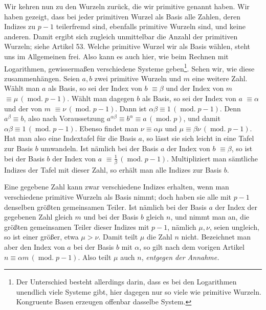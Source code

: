 Wir kehren nun zu den Wurzeln zurück, die wir primitive genannt haben. Wir haben gezeigt, dass bei jeder primitiven Wurzel als Basis alle Zahlen, deren Indizes zu $p-1$ teilerfremd sind, ebenfalls primitive Wurzeln sind, und keine anderen. Damit ergibt sich zugleich unmittelbar die Anzahl der primitiven Wurzeln; siehe Artikel 53. Welche primitive Wurzel wir als Basis wählen, steht uns im Allgemeinen frei. Also kann es auch hier, wie beim Rechnen mit Logarithmen, gewissermaßen verschiedene Systeme geben\begingroup\renewcommand{\thefootnote}{*)}\footnote{Der Unterschied besteht allerdings darin, dass es bei den Logarithmen unendlich viele Systeme gibt, hier dagegen nur so viele wie primitive Wurzeln. Kongruente Basen erzeugen offenbar dasselbe System.}\endgroup.
Sehen wir, wie diese zusammenhängen. Seien $a,b$ zwei primitive Wurzeln und $m$ eine weitere Zahl. Wählt man $a$ als Basis, so sei der Index von $b$ $\equiv\beta$ und der Index von $m$ $\equiv\mu\,(\operatorname{mod.}p-1)$. Wählt man dagegen $b$ als Basis, so sei der Index von $a$ $\equiv\alpha$ und der von $m$ $\equiv\nu\,(\operatorname{mod.}p-1)$. Dann ist $\alpha\beta\equiv1\,(\operatorname{mod.}p-1)$. Denn $a^\beta\equiv b$, also nach Voraussetzung $a^{\alpha\beta}\equiv b^\alpha\equiv a\,(\operatorname{mod.}p)$, und damit $\alpha\beta\equiv1\,(\operatorname{mod.}p-1)$. Ebenso findet man $\nu\equiv\alpha\mu$ und $\mu\equiv\beta\nu\,(\operatorname{mod.}p-1)$. Hat man also eine Indextafel für die Basis $a$, so lässt sie sich leicht in eine Tafel zur Basis $b$ umwandeln. Ist nämlich bei der Basis $a$ der Index von $b$ $\equiv\beta$, so ist bei der Basis $b$ der Index von $a$ $\equiv\frac{1}{\beta}\,(\operatorname{mod.}p-1)$. Multipliziert man sämtliche Indizes der Tafel mit dieser Zahl, so erhält man alle Indizes zur Basis $b$.

Eine gegebene Zahl kann zwar verschiedene Indizes erhalten, wenn man verschiedene primitive Wurzeln als Basis nimmt; doch haben sie alle mit $p-1$ denselben größten gemeinsamen Teiler. Ist nämlich bei der Basis $a$ der Index der gegebenen Zahl gleich $m$ und bei der Basis $b$ gleich $n$, und nimmt man an, die größten gemeinsamen Teiler dieser Indizes mit $p-1$, nämlich $\mu,\nu$, seien ungleich, so ist einer größer, etwa $\mu>\nu$. Damit teilt $\mu$ die Zahl $n$ nicht. Bezeichnet man aber den Index von $a$ bei der Basis $b$ mit $\alpha$, so gilt nach dem vorigen Artikel $n\equiv\alpha m\,(\operatorname{mod.}p-1)$. Also teilt $\mu$ auch $n$, \emph{entgegen der Annahme.}

